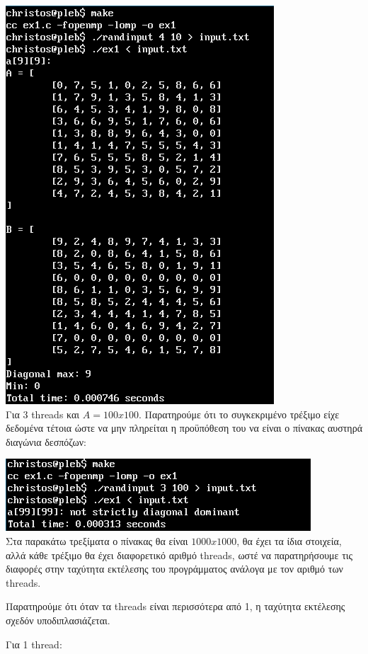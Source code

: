 \documentclass{article}
\begin{document}
\includegraphics{res/run2.png} \\

Για 3 threads και $A = 100x100$. Παρατηρούμε ότι το συγκεκριμένο τρέξιμο
είχε δεδομένα τέτοια ώστε να μην πληρείται η προϋπόθεση του να είναι ο πίνακας
αυστηρά διαγώνια δεσπόζων:

\includegraphics[width=\textwidth]{res/run3.png} \\

Στα παρακάτω τρεξίματα ο πίνακας θα είναι $1000x1000$, θα έχει τα ίδια
στοιχεία, αλλά κάθε τρέξιμο θα έχει διαφορετικό αριθμό threads, ωστέ να
παρατηρήσουμε τις διαφορές στην ταχύτητα εκτέλεσης του προγράμματος ανάλογα με
τον αριθμό των threads.

Παρατηρούμε ότι όταν τα threads είναι περισσότερα από 1, η ταχύτητα εκτέλεσης
σχεδόν υποδιπλασιάζεται.

Για 1 thread:
\end{document}
